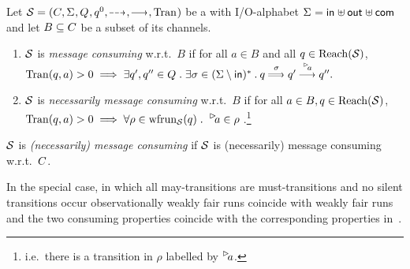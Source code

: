 \begin{definition}\label{def:cp-tgc-tgc}
    Let $\S = \maiotstup{}$ be a \MAIOTS with I/O-alphabet $\ioalpha{}$ and let $B \subseteq \chan$ be a subset of its channels.
            \begin{enumerate}[label=\alph*), ref=(\alph*), leftmargin=*, itemsep=1pt]
                \item\label{def:cp-tgc-tgc:bas-consuming}$\S$ is \emph{message consuming} w.r.t.\ $B$ if for all $a \in B$  and all $q \in \reach(\S)$,
                \\\hspace*{20pt}$
                    \val(q,a)>0 \implies \exists q',q''\in Q \;.\; \exists \sigma \in (\Sigma \setminus \inset)^* \: .\:q \mustw{\sigma} q' \must{\inact{a}} q''.
                 $
\vspace{1mm}
                \item\label{def:cp-tgc-tgc:nec-consuming}$\S$ is \emph{necessarily message consuming} w.r.t.\ $B$ if for all $a \in B, q \in \reach(\S)$,
\vspace{1mm}
                \\\hspace*{20pt}$
                  \val(q,a)>0 \implies \forall \rho \in \frun{\S}(q) \; .\;\;\inact{a} \in \rho \;$.\footnote{ i.e.\ there is a transition in $\rho$ labelled by $\inact{a}$.}
            \end{enumerate}
$\S$ is \emph{(necessarily) message consuming} if  $\S$ is (necessarily) message consuming w.r.t.\ $\chan$.

\end{definition}

In the special case, in which all may-transitions are must-transitions and no silent transitions occur
observationally weakly fair runs coincide with weakly fair runs and the two consuming properties coincide
with the corresponding properties in~\cite{haddad-et-al-2013}.


